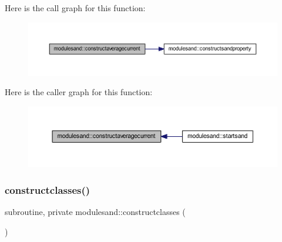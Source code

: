 Here is the call graph for this function\+:\nopagebreak
\begin{figure}[H]
\begin{center}
\leavevmode
\includegraphics[width=350pt]{namespacemodulesand_a04e1a85e46e9df0c79bdc0d537788c96_cgraph}
\end{center}
\end{figure}
Here is the caller graph for this function\+:\nopagebreak
\begin{figure}[H]
\begin{center}
\leavevmode
\includegraphics[width=350pt]{namespacemodulesand_a04e1a85e46e9df0c79bdc0d537788c96_icgraph}
\end{center}
\end{figure}
\mbox{\label{namespacemodulesand_a83a39e6e7dea7526131ca5a256383f63}} 
\subsubsection{\texorpdfstring{constructclasses()}{constructclasses()}}
{\footnotesize\ttfamily subroutine, private modulesand\+::constructclasses (\begin{DoxyParamCaption}{ }\end{DoxyParamCaption})\hspace{0.3cm}{\ttfamily [private]}}

